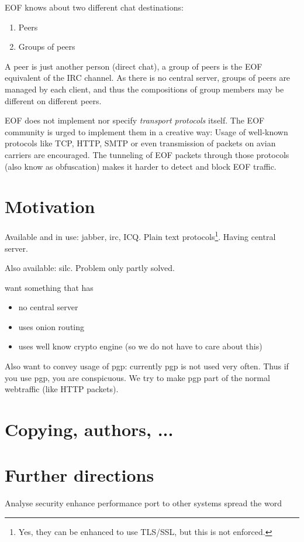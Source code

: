 \documentclass[12pt,a4paper]{book}
\begin{document}
EOF knows about two different chat destinations:
\begin{enumerate}
\item Peers
\item Groups of peers
\end{enumerate}
A peer is just another person (direct chat), a group of peers is the EOF
equivalent of the IRC channel\cite{irc-1}. As there is no central server,
groups of peers are managed by each client, and thus the compositions of
group members may be different on different peers.

EOF does not implement nor specify \emph{transport protocols} itself.
The EOF community is urged to implement them in a creative way: Usage
of well-known protocols like TCP\cite{tcp-1}, HTTP\cite{http-1},
SMTP\cite{smtp-1} or even transmission of packets on avian
carriers\cite{avian-1} are encouraged. The tunneling of EOF packets through
those protocols (also know as obfuscation) makes it harder to detect
and block EOF traffic.
\section{Motivation}
Available and in use: jabber, irc, ICQ.
Plain text protocols\footnote{Yes, they can be enhanced to use TLS/SSL,
but this is not enforced.}. Having central server.

Also available: silc.  Problem only partly solved.

want something that has
\begin{itemize}
\item no central server
\item uses onion routing
\item uses well know crypto engine (so we do not have to care about this)
\end{itemize}

Also want to convey usage of pgp: currently pgp is not used very often.
Thus if you use pgp, you are conspicuous. We try to make pgp part of the
normal webtraffic (like HTTP packets).
\section{Copying, authors, ...}
\section{Further directions}
Analyse security
enhance performance
port to other systems
spread the word
\end{document}
